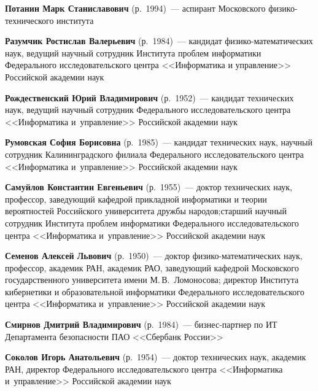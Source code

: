 \begin{multicols}{2}
 \noindent
\textbf{Потанин Марк Станиславович} (р.\ 1994)~--- аспирант Московского 
фи\-зи\-ко-тех\-ни\-че\-ско\-го института

\smallskip

\noindent
\textbf{Разумчик Ростислав Валерьевич} (р.\ 1984)~--- кандидат фи\-зи\-ко-ма\-те\-ма\-ти\-че\-ских  
наук, ведущий научный сотрудник Института проб\-лем информатики Федерального 
исследовательского центра <<Информатика и управление>> Российской академии наук

\smallskip  

\noindent
\textbf{Рождественский Юрий Владимирович} (р.\ 1952)~--- кандидат технических наук, ведущий 
научный сотрудник Федерального исследовательского центра <<Информатика и~управ\-ле\-ние>> 
Российской академии наук

\smallskip  

\noindent
\textbf{Румовская София Борисовна} (р.\ 1985)~--- кандидат технических наук, научный сотрудник 
Калининградского филиала Федерального исследовательского цент\-ра <<Информатика 
и~управ\-ле\-ние>> Российской академии наук

\smallskip  

\noindent
\textbf{Самуйлов Константин Евгеньевич} (р.\ 1955)~--- доктор технических наук, профессор,  
за\-ве\-ду\-ющий ка\-фед\-рой прикладной информатики и теории вероят\-ностей Российского 
университета друж\-бы народов;\linebreak старший научный сотрудник Института проб\-лем 
информатики Федерального исследовательского цент\-ра <<Информатика и~управ\-ле\-ние>> 
Российской академии наук

\smallskip  

\noindent
\textbf{Семенов Алексей Львович} (р.\ 1950)~--- доктор фи\-зи\-ко-ма\-те\-ма\-ти\-че\-ских  наук, 
профессор, академик РАН, академик РАО,  
за\-ве\-ду\-ющий кафедрой Мос\-ков\-ско\-го государственного университета имени М.\,В.~Ломоносова; 
директор Института кибернетики и образовательной информатики Федерального 
исследовательского цент\-ра <<Информатика и~управ\-ле\-ние>> Российской академии наук

\smallskip  

\noindent
\textbf{Смирнов Дмитрий Владимирович} (р.\ 1984)~--- бизнес-парт\-нер по ИТ Департамента 
безопасности ПАО <<Сбербанк России>>

\smallskip  

\noindent
\textbf{Соколов Игорь Анатольевич} (р.\ 1954)~--- доктор технических наук, академик РАН, директор 
Федерального исследовательского 
 цент\-ра <<Информатика и~управ\-ле\-ние>> Российской академии наук


\end{multicols}
